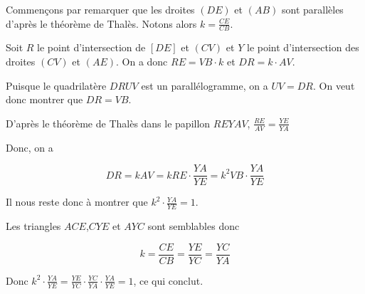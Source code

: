 \begin{sol}

\begin{center}
\end{center}

Commençons par remarquer que les droites $(DE)$ et $(AB)$ sont parallèles d'après le théorème de Thalès. Notons alors $k=\frac{CE}{CB}$.

\medskip

Soit $R$ le point d'intersection de $[DE]$ et $(CV)$ et $Y$ le point d'intersection des droites $(CV)$ et $(AE)$. On a donc $RE= VB \cdot k$ et $DR = k \cdot AV$.

Puisque le quadrilatère $DRUV$ est un parallélogramme, on a $UV=DR$. On veut donc montrer que $DR=VB$.
 
D'après le théorème de Thalès dans le papillon $REYAV$, $\frac{RE}{AV} = \frac{YE}{YA}$ 

Donc, on a 

\[DR=kAV= k RE\cdot \frac{YA}{YE} = k^2 VB\cdot \frac{YA}{YE}\]

Il nous reste donc à montrer que $k^2 \cdot \frac{YA}{YE} = 1$.

Les triangles $ACE$,$CYE$ et $AYC$ sont semblables donc 

\[ k = \frac{CE}{CB} = \frac{YE}{YC} = \frac{YC}{YA}\]


Donc $k^2 \cdot \frac{YA}{YE} = \frac{YE}{YC} \cdot \frac{YC}{YA} \cdot \frac{YA}{YE} = 1$, ce qui conclut. 
\end{sol}

